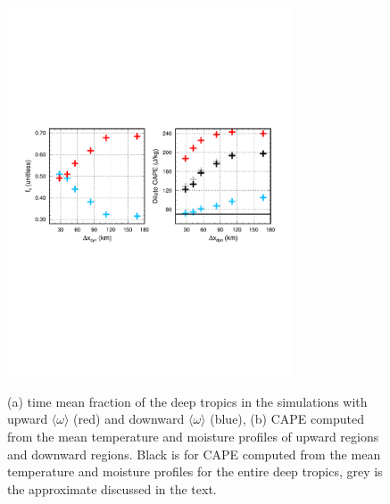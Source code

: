 \begin{figure}[t]
\begin{center}
\noindent\includegraphics[width=20pc,angle=0]{figs/temp_cape.pdf}\\
\end{center}
\caption{(a) time mean fraction of the deep tropics in the simulations with upward $\langle \omega \rangle$ (red) and downward $\langle \omega \rangle$ (blue), (b) CAPE computed from the mean temperature and moisture profiles of upward regions and downward regions. Black is for CAPE computed from the mean temperature and moisture profiles for the entire deep tropics, grey is the approximate discussed in the text.}
\label{fig:cape}
\end{figure}

